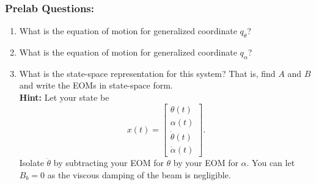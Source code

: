 \documentclass[12pt]{report}
\newcommand\drew[1]{\textcolor{red}{#1}}
\newcommand{\pder}[2]{\frac{\partial #1}{\partial #2}}
\begin{document}
\subsubsection{Prelab Questions:}\label{subsubsection:lab1a_prelab}
\begin{enumerate}
    \item What is the equation of motion for generalized coordinate $q_\theta$?\\
    \item What is the equation of motion for generalized coordinate $q_\alpha$?\\
    \item What is the state-space representation for this system? That is, find $A$ and $B$ and write the EOMs in state-space form.\\
          \textbf{Hint:} Let your state be
          \[
              x(t) =
              \left[\begin{array}{c}
                      \theta(t)       \\
                      \alpha(t)       \\
                      \dot{\theta}(t) \\
                      \dot{\alpha}(t)
                  \end{array}\right].
          \]
          Isolate $\ddot{\theta}$ by subtracting your EOM for $\theta$ by your EOM for $\alpha$. You can let $B_b = 0$ as the viscous damping of the beam is negligible.\\


\end{enumerate}
\end{document}
